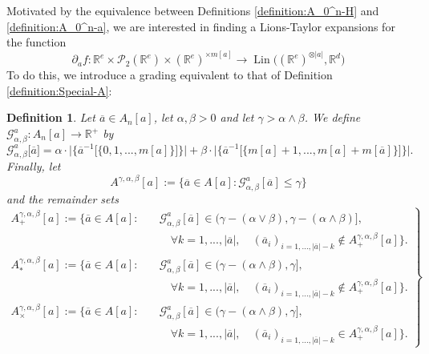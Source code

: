 \documentclass[a4paper,11pt,twoside]{article}
\numberwithin{equation}{section}
\theoremstyle{plain}
\newtheorem{definition}[theorem]{Definition}
\newcommand{\bR}{\mathbb{R}}
\newcommand{\cP}{\mathcal{P}}
\newcommand{\scG}{\mathscr{G}}
\DeclareMathOperator{\lin}{Lin}
\newcommand{\1}{\mathbbm{1}}
\begin{document}
	Motivated by the equivalence between Definitions \ref{definition:A_0^n-H} and \ref{definition:A_0^n-a}, we are interested in finding a Lions-Taylor expansions for the function
	$$
	\partial_a f: \bR^e \times \cP_2(\bR^e) \times (\bR^e)^{\times m[a]} \to \lin\big( (\bR^e)^{\otimes |a|}, \bR^d \big)
	$$
	To do this, we introduce a grading equivalent to that of Definition \ref{definition:Special-A}:
	\begin{definition}
		Let $\overline{a}\in A_n[a]$, let $\alpha, \beta>0$ and let $\gamma> \alpha\wedge \beta$. We define $\scG_{\alpha, \beta}^a: A_n[a] \to \bR^+$ by
		\begin{equation}
			\label{eq:Grading_bar[a]_given-a}
			\scG_{\alpha, \beta}^a\big[ \overline{a} \big] = \alpha\cdot \Big| \Big\{ \overline{a}^{-1}\big[ \{ 0, 1, ..., m[a] \} \big] \Big\} \Big| + \beta \cdot \Big| \Big\{ \overline{a}^{-1} \big[ \{m[a]+1, ..., m[a] + m[\overline{a}] \} \big] \Big\} \Big|. 
		\end{equation}
		Finally, let
		$$
		A^{\gamma, \alpha, \beta}[a]:=\Big\{ \overline{a}\in A[a]: \scG_{\alpha, \beta}^a[\overline{a}] \leq \gamma \Big\} 
		$$
		and the remainder sets
		\begin{equation}
			\left.
			\begin{aligned}
				A_{+}^{\gamma, \alpha, \beta}[a]:=\Big\{ \overline{a} \in A[a]:\quad & \scG_{\alpha, \beta}^a[\overline{a}] \in \big( \gamma - (\alpha\vee\beta), \gamma - (\alpha\wedge\beta)\big] , 
				\\
				&\quad \forall k=1, ..., |\overline{a}|, \quad (\overline{a}_i)_{i=1, ..., |\overline{a}|-k} \notin A_+^{\gamma, \alpha, \beta}[a] \Big\}. 
				\\
				A_{\ast}^{\gamma, \alpha, \beta}[a]:=\Big\{ \overline{a} \in A[a]:\quad & \scG_{\alpha, \beta}^a[\overline{a}] \in \big( \gamma - (\alpha\wedge\beta), \gamma \big] , 
				\\
				&\quad \forall k=1, ..., |\overline{a}|, \quad (\overline{a}_i)_{i=1, ..., |\overline{a}|-k} \notin A_+^{\gamma, \alpha, \beta}[a] \Big\}. 
				\\
				A_{\times}^{\gamma, \alpha, \beta}[a]:=\Big\{ \overline{a} \in A[a]:\quad & \scG_{\alpha, \beta}^a[\overline{a}] \in \big( \gamma - (\alpha\wedge\beta), \gamma \big], 
				\\
				&\quad \forall k=1, ..., |\overline{a}|, \quad (\overline{a}_i)_{i=1, ..., |\overline{a}|-k} \in A_+^{\gamma, \alpha, \beta}[a] \Big\}. 
			\end{aligned}
			\right\}
		\end{equation}
	\end{definition}
	
\end{document}
